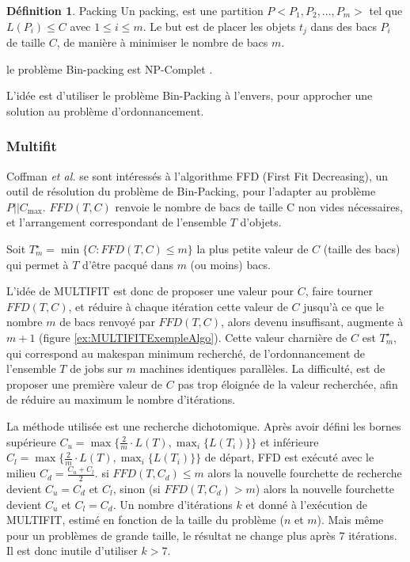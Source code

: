 \documentclass[a4paper,12pt]{report}
\theoremstyle{plain}				%
\theoremstyle{definition}				%
\newtheorem{definition}{Définition} %
\newcommand\problemGrahamP{$P||C_{\max}$\xspace}
\newcommand{\tdi}[1]{\todo[inline]{{#1}}{}}
\newcommand{\lp}[1]{\todo[author=LP,color=yellow,inline]{#1}}
\begin{document}
\begin{definition}{Packing}
  Un packing, est une partition $P<P_1, P_2, ..., P_m>$ tel que
  $L(P_i) \leq C$ avec $1 \leq i\leq m$.
  Le but est de placer les objets $t_j$ dans des bacs $P_i$ de taille
  $C$, de manière à minimiser le nombre de bacs $m$.
\end{definition}

le problème Bin-packing est NP-Complet \cite{Johnson1974WorstCasePB}.

L'idée est d'utiliser le problème Bin-Packing à l'envers, pour
approcher une solution au problème d'ordonnancement.


\subsubsection{Multifit}

Coffman \emph{et al.} \cite{coffman1978application} se sont
intéressés à l'algorithme FFD (First Fit Decreasing), un outil de
résolution du problème de Bin-Packing, pour l'adapter au problème
\problemGrahamP.
$FFD(T,C)$ renvoie le nombre de bacs de taille C non vides
nécessaires, et l'arrangement correspondant de l'ensemble $T$ d'objets.

\bigskip
Soit $T_m^\star = \min\{C:FFD(T,C) \leq m\}$ la plus petite valeur de
$C$ (taille des bacs) qui permet à $T$ d'être pacqué dans $m$ (ou moins)
bacs.

\bigskip


L'idée de MULTIFIT est donc de proposer une valeur pour $C$, faire
tourner $FFD(T,C) $, et réduire à chaque itération cette valeur de $C$
jusqu'à ce que le nombre $m$ de bacs renvoyé par $FFD(T,C) $, alors
devenu insuffisant, augmente à $m+1$ (figure \ref{ex:MULTIFITExempleAlgo}).
Cette valeur charnière de $C$ est $T_m^\star$, qui correspond au
makespan minimum recherché, de l'ordonnancement de l'ensemble $T$ de
jobs sur $m$ machines identiques parallèles.
La difficulté, est de proposer une première valeur de $C$ pas trop
éloignée de la valeur recherchée, afin de réduire au maximum le nombre
d'itérations.

La méthode utilisée est une recherche dichotomique.
Après avoir défini les bornes supérieure
$C_u = \max\{\frac{2}{m} \cdot L(T), \max_i\{L(T_i)\} \}$ et
inférieure $C_l = \max\{\frac{2}{m} \cdot L(T), \max_i\{L(T_i)\} \}$
de départ, FFD est exécuté avec le milieu $C_d = \frac{C_u + C_l}{2}$.
si $FFD(T,C_d)\le m$ alors la nouvelle fourchette de recherche devient
$C_u = C_d$ et $C_l$, sinon (si $FFD(T,C_d)> m$) alors la nouvelle
fourchette devient $C_u$ et $C_l = C_d$.
Un nombre d'itérations $k$ et donné à l'exécution de MULTIFIT, estimé
en fonction de la taille du problème ($n$ et $m$).
Mais même pour un problèmes de grande taille, le résultat ne change
plus après $7$ itérations.
Il est donc inutile d'utiliser $k>7$.
\end{document}
